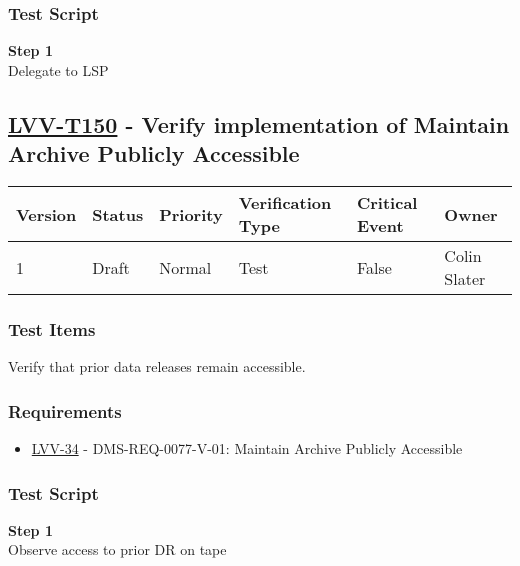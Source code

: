 \subsubsection{Test Script}\label{test-script-18}

\textbf{Step 1}\\
Delegate to LSP\\[2\baselineskip]

\hypertarget{lvv-t150---verify-implementation-of-maintain-archive-publicly-accessible}{\subsection{\texorpdfstring{\href{https://jira.lsstcorp.org/secure/Tests.jspa\#/testCase/LVV-T150}{LVV-T150}
- Verify implementation of Maintain Archive Publicly
Accessible}{LVV-T150 - Verify implementation of Maintain Archive Publicly Accessible}}\label{lvv-t150---verify-implementation-of-maintain-archive-publicly-accessible}}

\begin{longtable}[]{@{}llllll@{}}
\toprule
Version & Status & Priority & Verification Type & Critical Event &
Owner\tabularnewline
\midrule
\endhead
1 & Draft & Normal & Test & False & Colin Slater\tabularnewline
\bottomrule
\end{longtable}

\subsubsection{Test Items}\label{test-items-19}

Verify that prior data releases remain accessible.

\subsubsection{Requirements}\label{requirements-19}

\begin{itemize}
\tightlist
\item
  \href{https://jira.lsstcorp.org/browse/LVV-34}{LVV-34} -
  DMS-REQ-0077-V-01: Maintain Archive Publicly Accessible
\end{itemize}

\subsubsection{Test Script}\label{test-script-19}

\textbf{Step 1}\\
Observe access to prior DR on tape\\[2\baselineskip]

